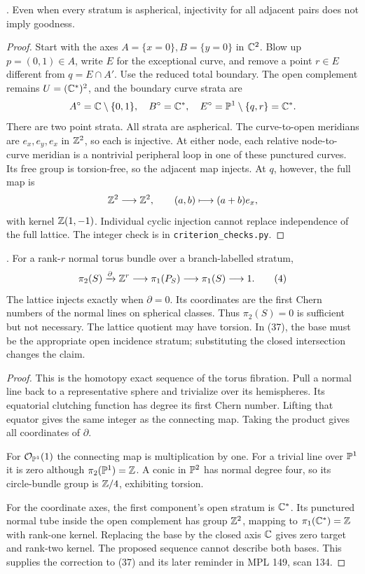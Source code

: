 \begin{counterexample}\label{P1b2}
.
Even when every stratum is aspherical, injectivity for all adjacent
pairs does not imply goodness.
\end{counterexample}
\begin{proof}
Start with the axes $A=\{x=0\},B=\{y=0\}$ in $\mathbb C^2$.
Blow up $p=(0,1)\in A$, write $E$ for the exceptional
curve, and remove a point $r\in E$ different from
$q=E\cap A'$. Use the reduced total boundary.
The open complement remains $U=(\mathbb C^*)^2$, and the
boundary curve strata are
\[
 A^\circ=\mathbb C\setminus\{0,1\},\quad B^\circ=\mathbb C^*,\quad
 E^\circ=\mathbb P^1\setminus\{q,r\}=\mathbb C^* .
\]
There are two point strata. All strata are aspherical.
The curve-to-open meridians are $e_x,e_y,e_x$ in $\mathbb Z^2$,
so each is injective. At either node, each relative
node-to-curve meridian is a nontrivial peripheral loop
in one of these punctured curves. Its free group is
torsion-free, so the adjacent map injects.
At $q$, however, the full map is
\[
 \mathbb Z^2\longrightarrow\mathbb Z^2,\qquad (a,b)\longmapsto(a+b)e_x,
\]
with kernel $\mathbb Z(1,-1)$. Individual cyclic injection
cannot replace independence of the full lattice.
The integer check is in \texttt{criterion\_checks.py}.
\end{proof}

\begin{proposition}\label{P1b3}
.
For a rank-$r$ normal torus bundle over a branch-labelled stratum,
\[
 \pi_2(S)\xrightarrow{\partial}\mathbb Z^r
 \longrightarrow\pi_1(P_S)\longrightarrow\pi_1(S)\longrightarrow1.
 \tag{4}
\]
The lattice injects exactly when $\partial=0$.
Its coordinates are the first Chern numbers of the normal
lines on spherical classes. Thus $\pi_2(S)=0$ is sufficient
but not necessary. The lattice quotient may have torsion.
In (37), the base must be the appropriate open incidence
stratum; substituting the closed intersection changes the claim.
\end{proposition}
\begin{proof}
This is the homotopy exact sequence of the torus fibration.
Pull a normal line back to a representative sphere and
trivialize over its hemispheres. Its equatorial clutching
function has degree its first Chern number. Lifting that
equator gives the same integer as the connecting map.
Taking the product gives all coordinates of $\partial$.

For $\mathcal O_{\mathbb P^1}(1)$ the connecting map is
multiplication by one. For a trivial line over $\mathbb P^1$
it is zero although $\pi_2(\mathbb P^1)=\mathbb Z$.
A conic in $\mathbb P^2$ has normal degree four, so its
circle-bundle group is $\mathbb Z/4$, exhibiting torsion.

For the coordinate axes, the first component's open
stratum is $\mathbb C^*$. Its punctured normal tube inside
the open complement has group $\mathbb Z^2$, mapping to
$\pi_1(\mathbb C^*)=\mathbb Z$ with rank-one kernel.
Replacing the base by the closed axis $\mathbb C$ gives
zero target and rank-two kernel. The proposed
sequence cannot describe both bases. This supplies
the correction to (37) and its later reminder in
MPL 149, scan 134.
\end{proof}

